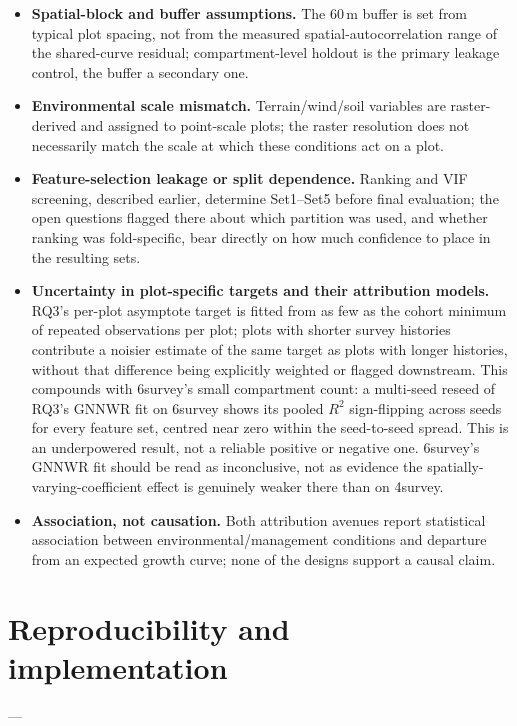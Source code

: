 \begin{itemize}
\setlength\itemsep{0pt}
\item \textbf{Spatial-block and buffer assumptions.} The 60\,m buffer is set from typical plot
  spacing, not from the measured spatial-autocorrelation range of the shared-curve residual;
  compartment-level holdout is the primary leakage control, the buffer a
  secondary one.
\item \textbf{Environmental scale mismatch.} Terrain/wind/soil variables are raster-derived and
  assigned to point-scale plots; the raster resolution does not necessarily match the scale at
  which these conditions act on a plot.
\item \textbf{Feature-selection leakage or split dependence.} Ranking and VIF screening, described
  earlier, determine Set1--Set5 before final evaluation; the open questions
  flagged there about which partition was used, and whether ranking was fold-specific, bear
  directly on how much confidence to place in the resulting sets.
\item \textbf{Uncertainty in plot-specific targets and their attribution models.} RQ3's per-plot
  asymptote target is fitted from as few as the cohort minimum of repeated
  observations per plot; plots with shorter survey histories contribute a noisier estimate of the
  same target as plots with longer histories, without that difference being explicitly weighted or
  flagged downstream. This compounds with 6survey's small compartment count: a multi-seed reseed
  of RQ3's GNNWR fit on 6survey shows its pooled $R^2$ sign-flipping across seeds for every feature
  set, centred near zero within the seed-to-seed spread. This is an underpowered result, not a
  reliable positive or negative one. 6survey's GNNWR fit should be read as inconclusive, not as
  evidence the spatially-varying-coefficient effect is genuinely weaker there than on 4survey.
\item \textbf{Association, not causation.} Both attribution avenues report statistical association
  between environmental/management conditions and departure from
  an expected growth curve; none of the designs support a causal claim.
\end{itemize}

\section{Reproducibility and implementation}
--- 

